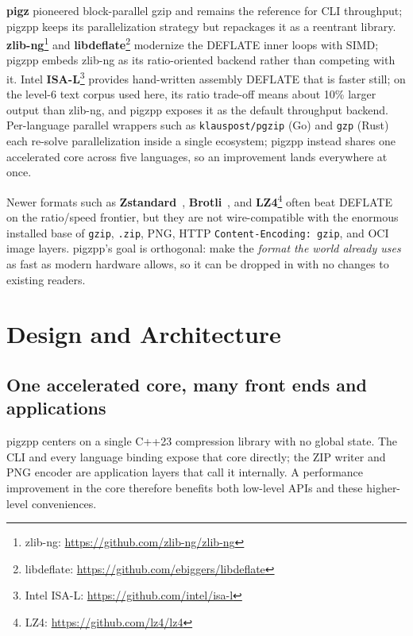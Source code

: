 \documentclass{pigzpp-whitepaper}
\begin{document}
\textbf{pigz} pioneered block-parallel gzip and remains the reference
for CLI throughput; pigzpp keeps its parallelization strategy but repackages it
as a reentrant library. \textbf{zlib-ng}\footnote{zlib-ng:
\url{https://github.com/zlib-ng/zlib-ng}} and \textbf{libdeflate}\footnote{libdeflate:
\url{https://github.com/ebiggers/libdeflate}} modernize the DEFLATE inner loops
with SIMD; pigzpp embeds zlib-ng as its ratio-oriented backend rather than
competing with it. Intel \textbf{ISA-L}\footnote{Intel ISA-L:
\url{https://github.com/intel/isa-l}} provides hand-written assembly DEFLATE that
is faster still; on the level-6 text corpus used here, its ratio trade-off means
about 10\% larger output than zlib-ng,
and pigzpp exposes it as the default throughput backend. Per-language parallel
wrappers such as \texttt{klauspost/pgzip} (Go) and \texttt{gzp} (Rust) each
re-solve parallelization inside a single ecosystem; pigzpp instead shares one
accelerated core across five languages, so an improvement lands everywhere at
once.

Newer formats such as \textbf{Zstandard}~\citep{rfc8878},
\textbf{Brotli}~\citep{brotli2019}, and
\textbf{LZ4}\footnote{LZ4: \url{https://github.com/lz4/lz4}} often beat
DEFLATE on the ratio/speed frontier, but they are not wire-compatible with the
enormous installed base of \texttt{gzip}, \texttt{.zip}, PNG, HTTP
\texttt{Content-Encoding: gzip}, and OCI image layers. pigzpp's goal is
orthogonal: make the \emph{format the world already uses} as fast as modern
hardware allows, so it can be dropped in with no changes to existing readers.

\section{Design and Architecture}
\subsection{One accelerated core, many front ends and applications}
pigzpp centers on a single C++23 compression library with no global state.
The CLI and every language binding expose that core directly; the ZIP writer and
PNG encoder are application layers that call it internally. A performance
improvement in the core therefore benefits both low-level APIs and these
higher-level conveniences.
\end{document}
